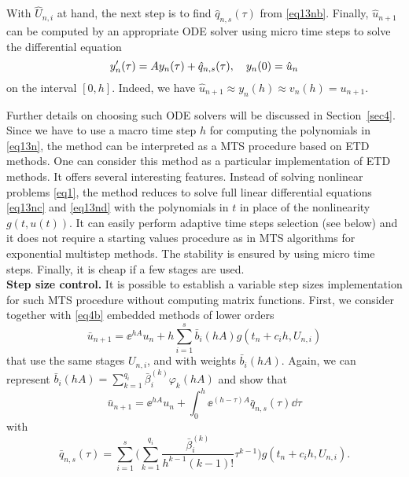 With  $\widehat{U}_{n,i}$ at hand, the next step is to find  $\hat{q}_{n,s}(\tau) $ 
 from \eqref{eq13nb}. Finally, $\hat{u}_{n+1}$ can be computed by  an appropriate ODE solver
using micro time steps to solve the differential equation
\begin{equation} \label{eq13nd} 
y'_{n}(\tau)=Ay_{n}(\tau) +   \hat{q}_{n,s}(\tau), \q  y_{n}(0)=\hat{u}_n
\end{equation}
on the interval $[0, h]$. Indeed, we have $\hat{u}_{n+1}\approx y_{n}(h) \approx v_{n}(h)=u_{n+1}.$ 

Further details on choosing such ODE solvers will be discussed in Section~\ref{sec4}. 
Since we have to use a macro time step $h$ for computing the polynomials in \eqref{eq13n}, the method can be interpreted as a MTS procedure based on ETD methods. 
One can consider this method as a particular implementation of ETD methods. It offers several  interesting features. 
Instead of solving nonlinear problems \eqref{eq1}, the method reduces to solve full linear 
differential equations  \eqref{eq13nc} and  \eqref{eq13nd}  with the polynomials in $t$ in place of the nonlinearity $g(t,u(t))$. It can easily  perform adaptive time steps selection (see below) and it does not require a starting values procedure as 
in MTS algorithms for exponential multistep methods. The stability is ensured by using micro time steps.
Finally,  it is cheap  if a few stages are used. \\
{\bf Step size control.} 
It is possible to establish a variable step sizes implementation for such MTS procedure without 
computing matrix functions. 
First, we consider together with  \eqref{eq4b} embedded methods of lower orders
\begin{equation} \label{eq3.15}
\bar{u}_{n+1} = \ee^{h A}u_n +  h \sum_{i=1}^{s}\bar{b}_{i}(h A)g(t_n +c_i h, U_{n,i})
\end{equation}
that use the same stages $U_{n,i}$, and with weights $\bar{b}_{i}(hA)$. Again, we can represent
$\bar{b}_{i}(h A)=\sum_{k=1}^{q_i}\bar{\beta}^{(k)}_{i}\varphi_{k}(hA)$ and show that
\begin{equation} \label{eq3.15a}
\bar{u}_{n+1}= \ee^{h A}u_n +  \int_{0}^{h} \ee^{(h-\tau)A}  \bar{q}_{n,s}(\tau) \dd\tau  
\end{equation}
with 
\begin{equation}\label{eq3.15b}
\bar{q}_{n,s}(\tau) = \sum_{i=1}^{s} \Big(\sum_{k=1}^{q_i}\dfrac{\bar{\beta}^{(k)}_{i} }{h^{k-1}(k-1)!}\tau^{k-1} \Big) g(t_n +c_i h, U_{n,i}).  
\end{equation}  
